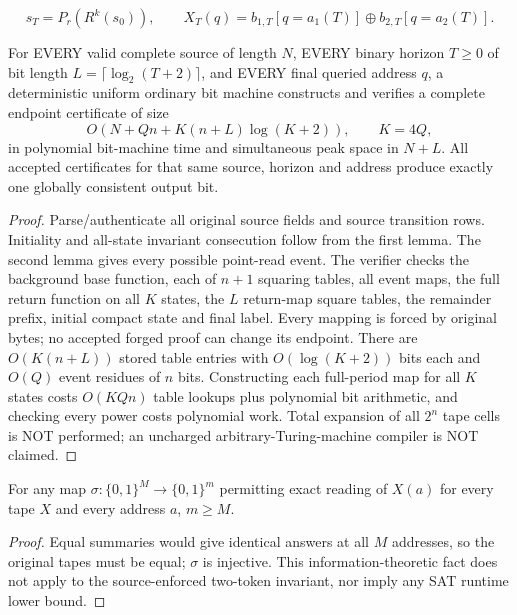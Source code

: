 \documentclass[11pt]{article}
\begin{document}
\[
s_T=P_r(R^k(s_0)),\qquad
X_T(q)=b_{1,T}[q=a_1(T)]\oplus b_{2,T}[q=a_2(T)].
\]
\begin{theorem}
For EVERY valid complete source of length $N$, EVERY binary horizon $T\ge0$ of bit length $L=\lceil\log_2(T+2)\rceil$, and EVERY final queried address $q$, a deterministic uniform ordinary bit machine constructs and verifies a complete endpoint certificate of size
\[
O(N+Qn+K(n+L)\log(K+2)),\qquad K=4Q,
\]
in polynomial bit-machine time and simultaneous peak space in $N+L$. All accepted certificates for that same source, horizon and address produce exactly one globally consistent output bit.
\end{theorem}
\begin{proof}Parse/authenticate all original source fields and source transition rows. Initiality and all-state invariant consecution follow from the first lemma. The second lemma gives every possible point-read event. The verifier checks the background base function, each of $n+1$ squaring tables, all event maps, the full return function on all $K$ states, the $L$ return-map square tables, the remainder prefix, initial compact state and final label. Every mapping is forced by original bytes; no accepted forged proof can change its endpoint. There are $O(K(n+L))$ stored table entries with $O(\log(K+2))$ bits each and $O(Q)$ event residues of $n$ bits. Constructing each full-period map for all $K$ states costs $O(KQn)$ table lookups plus polynomial bit arithmetic, and checking every power costs polynomial work. Total expansion of all $2^n$ tape cells is NOT performed; an uncharged arbitrary-Turing-machine compiler is NOT claimed.\end{proof}
\begin{proposition}
For any map $\sigma:\{0,1\}^M\to\{0,1\}^m$ permitting exact reading of $X(a)$ for every tape $X$ and every address $a$, $m\ge M$.
\end{proposition}
\begin{proof}Equal summaries would give identical answers at all $M$ addresses, so the original tapes must be equal; $\sigma$ is injective. This information-theoretic fact does not apply to the source-enforced two-token invariant, nor imply any SAT runtime lower bound.\end{proof}
\end{document}
